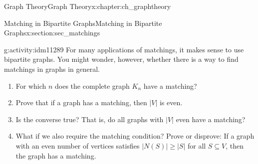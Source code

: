 \documentclass[oneside,10pt,]{book}
\numberwithin{equation}{chapter}
\newcommand{\card}[1]{\left| #1 \right|}
\begin{document}
\begin{chapterptx}{Graph Theory}{}{Graph Theory}{}{}{x:chapter:ch_graphtheory}
\begin{sectionptx}{Matching in Bipartite Graphs}{}{Matching in Bipartite Graphs}{}{}{x:section:sec_matchings}
\begin{activity}{}{g:activity:idm11289}%
For many applications of matchings, it makes sense to use bipartite graphs. You might wonder, however, whether there is a way to find matchings in graphs in general.%
\begin{enumerate}[font=\bfseries,label=(\alph*),ref=\alph*]
\item{}For which \(n\) does the complete graph \(K_n\) have a matching?%
\item{}Prove that if a graph has a matching, then \(\card{V}\) is even.%
\item{}Is the converse true?  That is, do all graphs with \(\card{V}\) even have a matching?%
\item{}What if we also require the matching condition?  Prove or disprove: If a graph with an even number of vertices satisfies \(\card{N(S)} \ge \card{S}\) for all \(S \subseteq V\), then the graph has a matching.%
\end{enumerate}
\end{activity}
\end{sectionptx}
\end{chapterptx}
%
%
%
%
\typeout{************************************************}
\typeout{************************************************}
%
%
\appendix
%
\end{document}

